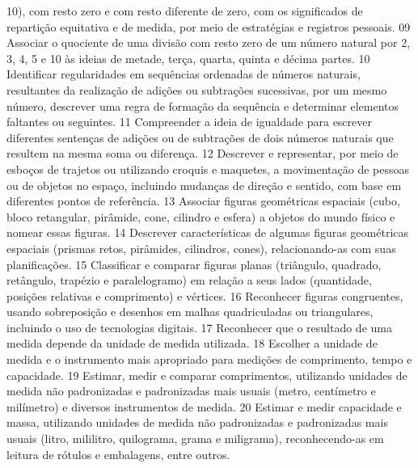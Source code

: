 {{{{{							10), com resto zero e com resto diferente de zero, com os significados de repartição equitativa
							e de medida, por meio de estratégias e registros pessoais.
						}
						{09}{%
							Associar o quociente de uma divisão com resto zero de um número natural por 2,
							3, 4, 5 e 10 às ideias de metade, terça, quarta, quinta e décima partes.
						}
						{10}{%
							Identificar regularidades em sequências ordenadas de números naturais,
							resultantes da realização de adições ou subtrações sucessivas, por um mesmo número,
							descrever uma regra de formação da sequência e determinar elementos faltantes ou seguintes.
						}
						{11}{%
							Compreender a ideia de igualdade para escrever diferentes sentenças de adições
							ou de subtrações de dois números naturais que resultem na mesma soma ou diferença.
						}
						{12}{%
							Descrever e representar, por meio de esboços de trajetos ou utilizando croquis
							e maquetes, a movimentação de pessoas ou de objetos no espaço, incluindo mudanças de
							direção e sentido, com base em diferentes pontos de referência.
						}
						{13}{%
							Associar figuras geométricas espaciais (cubo, bloco retangular, pirâmide, cone,
							cilindro e esfera) a objetos do mundo físico e nomear essas figuras.
						}
						{14}{%
							Descrever características de algumas figuras geométricas espaciais (prismas
							retos, pirâmides, cilindros, cones), relacionando-as com suas planificações.
						}
						{15}{%
							Classificar e comparar figuras planas (triângulo, quadrado, retângulo, trapézio
							e paralelogramo) em relação a seus lados (quantidade, posições relativas e comprimento) e
							vértices.
						}
						{16}{%
							Reconhecer figuras congruentes, usando sobreposição e desenhos em malhas
							quadriculadas ou triangulares, incluindo o uso de tecnologias digitais.
						}
						{17}{%
							Reconhecer que o resultado de uma medida depende da unidade de medida
							utilizada.
						}
						{18}{%
							Escolher a unidade de medida e o instrumento mais apropriado para medições de
							comprimento, tempo e capacidade.
						}
						{19}{%
							Estimar, medir e comparar comprimentos, utilizando unidades de medida
							não padronizadas e padronizadas mais usuais (metro, centímetro e milímetro) e diversos
							instrumentos de medida.
						}
						{20}{%
							Estimar e medir capacidade e massa, utilizando unidades de medida não
							padronizadas e padronizadas mais usuais (litro, mililitro, quilograma, grama e miligrama),
							reconhecendo-as em leitura de rótulos e embalagens, entre outros.
}}}}}
